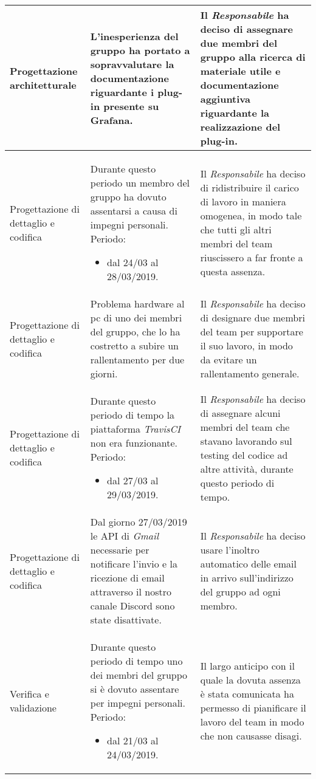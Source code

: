 \begin{longtable}{| L{7em} | L{15em} | L{16em} |}
Progettazione architetturale & L'inesperienza del gruppo ha portato a sopravvalutare la documentazione riguardante i plug-in presente su Grafana. & Il \emph{Responsabile} ha deciso di assegnare due membri del gruppo alla ricerca di materiale utile e documentazione aggiuntiva riguardante la realizzazione del plug-in. \\
\hline

Progettazione di dettaglio e codifica & Durante questo periodo un membro del gruppo ha dovuto assentarsi a causa di impegni personali. Periodo:\begin{itemize}
	\item dal 24/03 al 28/03/2019.
\end{itemize} & Il \emph{Responsabile} ha deciso di ridistribuire il carico di lavoro in maniera omogenea, in modo tale che tutti gli altri membri del team riuscissero a far fronte a questa assenza. \\
\hline

Progettazione di dettaglio e codifica & Problema hardware al pc di uno dei membri del gruppo, che lo ha costretto a subire un rallentamento per due giorni. & Il \emph{Responsabile} ha deciso di designare due membri del team per supportare il suo lavoro, in modo da evitare un rallentamento generale. \\
\hline

Progettazione di dettaglio e codifica & Durante questo periodo di tempo la piattaforma \emph{TravisCI} non era funzionante. Periodo:\begin{itemize}
	\item dal 27/03 al 29/03/2019.
\end{itemize} & Il \emph{Responsabile} ha deciso di assegnare alcuni membri del team che stavano lavorando sul testing del codice ad altre attività, durante questo periodo di tempo. \\
\hline

Progettazione di dettaglio e codifica & Dal giorno 27/03/2019 le API di \emph{Gmail} necessarie per notificare l'invio e la ricezione di email attraverso il nostro canale Discord sono state disattivate. & Il \emph{Responsabile} ha deciso usare l'inoltro automatico delle email in arrivo sull'indirizzo del gruppo ad ogni membro. \\
\hline

Verifica e validazione & Durante questo periodo di tempo uno dei membri del gruppo si è dovuto assentare per impegni personali. Periodo:\begin{itemize}
	\item dal 21/03 al 24/03/2019.
\end{itemize} & Il largo anticipo con il quale la dovuta assenza è stata comunicata ha permesso di pianificare il lavoro del team in modo che non causasse disagi.\\
\hline


\end{longtable}
